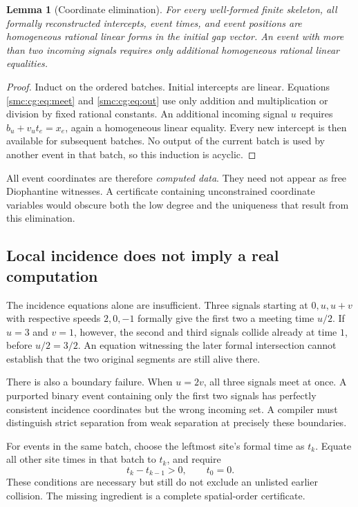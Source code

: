 \documentclass[11pt,letterpaper]{article}
\numberwithin{equation}{section}
\newtheorem{lemma}[theorem]{Lemma}
\theoremstyle{definition}
\theoremstyle{remark}
\begin{document}
\begin{lemma}[Coordinate elimination]
For every well-formed finite skeleton, all formally reconstructed intercepts,
event times, and event positions are homogeneous rational linear forms in
the initial gap vector. An event with more than two incoming signals requires
only additional homogeneous rational linear equalities.
\end{lemma}
\begin{proof}
Induct on the ordered batches. Initial intercepts are linear. Equations
\eqref{smc:cg:eq:meet} and \eqref{smc:cg:eq:out} use only addition and multiplication or
division by fixed rational constants. An additional incoming signal $u$
requires $b_u+v_ut_e=x_e$, again a homogeneous linear equality. Every new
intercept is then available for subsequent batches. No output of the current
batch is used by another event in that batch, so this induction is acyclic.
\end{proof}

All event coordinates are therefore \emph{computed data}. They need not
appear as free Diophantine witnesses. A certificate containing unconstrained
coordinate variables would obscure both the low degree and the uniqueness
that result from this elimination.

\subsection{Local incidence does not imply a real computation}

The incidence equations alone are insufficient. Three signals starting at
$0,u,u+v$ with respective speeds $2,0,-1$ formally give the first two a
meeting time $u/2$. If $u=3$ and $v=1$, however, the second and third signals
collide already at time $1$, before $u/2=3/2$. An equation witnessing the
later formal intersection cannot establish that the two original segments
are still alive there.

There is also a boundary failure. When $u=2v$, all three signals meet at
once. A purported binary event containing only the first two signals has
perfectly consistent incidence coordinates but the wrong incoming set.
A compiler must distinguish strict separation from weak separation at
precisely these boundaries.

For events in the same batch, choose the leftmost site's formal time as
$t_k$. Equate all other site times in that batch to $t_k$, and require
\begin{equation}
 t_k-t_{k-1}>0,\qquad t_0=0.
 \label{smc:cg:eq:batchorder}
\end{equation}
These conditions are necessary but still do not exclude an unlisted earlier
collision. The missing ingredient is a complete spatial-order certificate.
\end{document}

